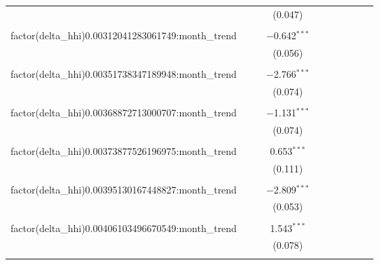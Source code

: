 \begin{table}[H]
{\begin{tabular}{@{\extracolsep{5pt}}lccccccccc}
   &  &  & (0.047) &  &  &  &  &  &  \\  

   & & & & & & & & & \\  

  factor(delta\_hhi)0.00312041283061749:month\_trend &  &  & $-$0.642$^{***}$ &  &  &  &  &  &  \\  

   &  &  & (0.056) &  &  &  &  &  &  \\  

   & & & & & & & & & \\  

  factor(delta\_hhi)0.00351738347189948:month\_trend &  &  & $-$2.766$^{***}$ &  &  &  &  &  &  \\  

   &  &  & (0.074) &  &  &  &  &  &  \\  

   & & & & & & & & & \\  

  factor(delta\_hhi)0.00368872713000707:month\_trend &  &  & $-$1.131$^{***}$ &  &  &  &  &  &  \\  

   &  &  & (0.074) &  &  &  &  &  &  \\  

   & & & & & & & & & \\  

  factor(delta\_hhi)0.00373877526196975:month\_trend &  &  & 0.653$^{***}$ &  &  &  &  &  &  \\  

   &  &  & (0.111) &  &  &  &  &  &  \\  

   & & & & & & & & & \\  

  factor(delta\_hhi)0.00395130167448827:month\_trend &  &  & $-$2.809$^{***}$ &  &  &  &  &  &  \\  

   &  &  & (0.053) &  &  &  &  &  &  \\  

   & & & & & & & & & \\  

  factor(delta\_hhi)0.00406103496670549:month\_trend &  &  & 1.543$^{***}$ &  &  &  &  &  &  \\  

   &  &  & (0.078) &  &  &  &  &  &  \\  

   & & & & & & & & & \\  


\end{tabular}}
\end{table}
